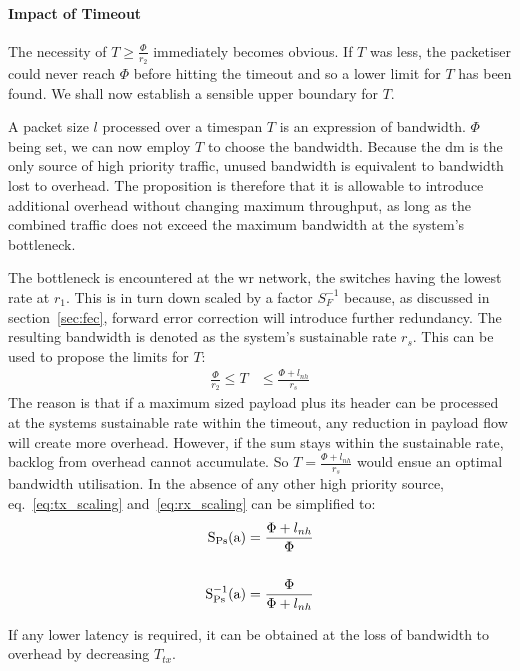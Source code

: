\paragraph{Impact of Timeout}
The necessity of  $T \ge \frac{\Phi}{r_2}$ immediately becomes obvious. If $T$ was less, the packetiser could never reach $\Phi$ before hitting the timeout and so a lower limit for $T$ has been found.
We shall now establish a sensible upper boundary for $T$.
\par
A packet size $l$ processed over a timespan $T$ is an expression of bandwidth. $\Phi$ being set, we can now employ $T$ to choose the bandwidth.
Because the \gls{dm} is the only source of high priority traffic, unused bandwidth is equivalent to bandwidth lost to overhead.
The proposition is therefore that it is allowable to introduce additional overhead without changing maximum throughput, as long as the combined traffic does not exceed the maximum bandwidth at the system's bottleneck.
\par
The bottleneck is encountered at the \gls{wr} network, the switches having the lowest rate at $r_1$. This is in turn down scaled by a factor $S^{-1}_F$ because, as discussed in section~\ref{sec:fec},
forward error correction will introduce further redundancy. The resulting bandwidth is denoted as the system's sustainable rate $r_s$. 
This can be used to propose the limits for $T$:
%
\begin{align}
\frac{\Phi}{r_2} \le T &\le \frac{\Phi + l_{nh}}{r_s}
\end{align}
%
The reason is that if a maximum sized payload plus its header can be processed at the systems sustainable rate within the timeout,
any reduction in payload flow will create more overhead. However, if the sum stays within the sustainable rate, backlog from overhead cannot accumulate.
So $T = \frac{\Phi + l_{nh}}{r_s}$ would ensue an optimal bandwidth utilisation. In the absence of any other high priority source, eq.~\ref{eq:tx_scaling} and~\ref{eq:rx_scaling} can be simplified to:
\begin{align}
\mathrm{S_{Ps}(a)}      &=  \frac{\Phi + l_{nh}}{\Phi} \label{eq:simple_tx_scaling}\\
\notag\\
\mathrm{S^{-1}_{Ps}(a)} &=  \frac{\Phi}{\Phi + l_{nh}}  \label{eq:simple_rx_scaling}
\end{align}

If any lower latency is required, it can be obtained at the loss of bandwidth to overhead by decreasing $T_{tx}$.

